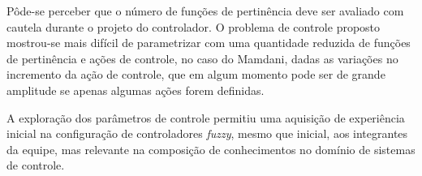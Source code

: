 \documentclass[
	twoside,				%
	twocolumn,				%
	english,				%
	brazil,					%
]{article}
\begin{document}
Pôde-se perceber que o número de funções de pertinência deve ser avaliado com cautela durante o projeto do controlador. O problema de controle proposto mostrou-se mais difícil de parametrizar com uma quantidade reduzida de funções de pertinência e ações de controle, no caso do Mamdani, dadas as variações no incremento da ação de controle, que em algum momento pode ser de grande amplitude se apenas algumas ações forem definidas.

A exploração dos parâmetros de controle permitiu uma aquisição de experiência inicial na configuração de controladores \textit{fuzzy}, mesmo que inicial, aos integrantes da equipe, mas relevante na composição de conhecimentos no domínio de sistemas de controle.

\end{document}
